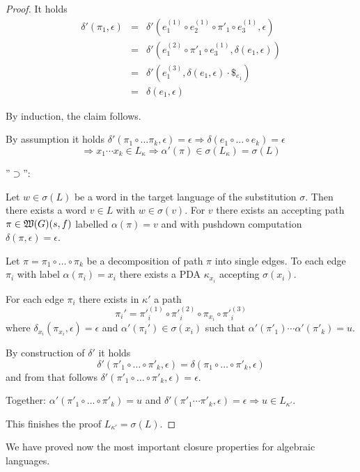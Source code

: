 \begin{proof}
It holds
\begin{eqnarray*}
\delta'(\pi_1, \epsilon) &=& \delta'(e_1^{(1)} \circ e_2^{(1)} \circ \pi'_1
\circ e_3^{(1)}, \epsilon) \\
&=& \delta'(e_1^{(2)} \circ \pi'_1 \circ e_3^{(1)}, \delta(e_1,\epsilon))
\\
&=& \delta'(e_1^{(3)}, \delta(e_1, \epsilon) \cdot {\$}_{e_1}) \\
&=& \delta(e_1, \epsilon)
\end{eqnarray*}

By induction, the claim follows.

By assumption it holds $\delta'(\pi_1 \circ \ldots \pi_k, \epsilon) = \epsilon
\Rightarrow \delta(e_1 \circ \ldots \circ e_k) = \epsilon$ 
\[ \Rightarrow x_1 \cdots x_k \in L_{\kappa} \Rightarrow \alpha'(\pi) \in
\sigma(L_{\kappa}) = \sigma(L) \]

\bigskip
''$\supset$'':

Let $w \in \sigma(L)$ be a word in the target language of the substitution
$\sigma$. Then there exists a word $v \in L$ with $w \in \sigma(v)$. For $v$
there exists an accepting path $\pi \in \mbox{$\mathfrak{W}(G)$}(s, f)$ labelled
$\alpha(\pi) = v$ and with pushdown computation $\delta(\pi, \epsilon) =
\epsilon$.

Let $\pi = \pi_1 \circ\ldots\circ \pi_k$ be a decomposition of path $\pi$ into
single edges. To each edge $\pi_i$ with label $\alpha(\pi_i) = x_i$ there exists
a PDA $\kappa_{x_i}$ accepting $\sigma(x_i)$.

For each edge $\pi_i$ there exists in $\kappa'$ a path 
\[ \pi_i' = {\pi'}_i^{(1)} \circ {\pi'}_i^{(2)} \circ \pi_{x_i} \circ
{\pi'}_i^{(3)} \]
where $\delta_{x_i}(\pi_{x_i}, \epsilon) = \epsilon$ and
$\alpha'(\pi_i') \in \sigma(x_i)$ such that $\alpha'({\pi'}_1) \cdots \alpha'({\pi'}_k) = u$.

By construction of $\delta'$ it holds 
\[ \delta'(\pi'_1 \circ\ldots\circ \pi'_k, \epsilon) = \delta(\pi_1
\circ\ldots\circ \pi'_k, \epsilon) \]
and from that follows $\delta'(\pi'_1 \circ\ldots\circ \pi'_k, \epsilon) =
\epsilon$.

Together: $\alpha'(\pi'_1 \circ\ldots\circ \pi'_k) = u$ and $\delta'(\pi'_1
\cdots \pi'_k, \epsilon) = \epsilon \Rightarrow u \in L_{\kappa'}$.

\medskip
This finishes the proof $L_{\kappa'} = \sigma(L)$.
\end{proof}

\bigskip
We have proved now the most important closure properties for algebraic
languages.

